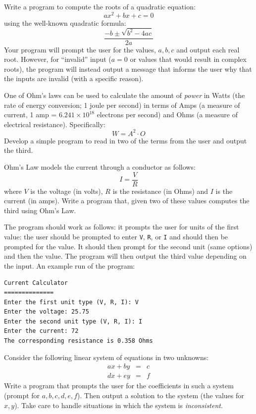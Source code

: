 \begin{exer}
Write a program to compute the roots of a quadratic equation:
  $$ax^2 + bx + c = 0$$
using the well-known quadratic formula:
  $$\frac{-b \pm \sqrt{b^2 - 4ac}}{2a}$$
Your program will prompt the user for the values, $a, b, c$ and output each real root.
However, for ``invalid'' input ($a = 0$ or values that would result in complex roots), the
program will instead output a message that informs the user why that the inputs are invalid
(with a specific reason).
\end{exer}

\begin{exer}
One of Ohm's laws can be used to calculate the amount of \emph{power} 
in Watts (the rate of energy conversion; 1 joule per second) in terms of Amps (a measure of current, 1 amp = $6.241 \times 10^{18}$ 
electrons per second) and Ohms (a measure of electrical resistance).  Specifically:
  $$W = A^2 \cdot O$$
Develop a simple program to read in two of the terms from the user and output the third.
\end{exer}

\begin{exer}
Ohm's Law models the current through a conductor as follows:
 $$I = \frac{V}{R}$$
where $V$ is the voltage (in volts), $R$ is the resistance (in Ohms) and $I$ is the
current (in amps).  Write a program that, given two of these values computes the
third using Ohm's Law.

The program should work as follows: it prompts the user for units of the first value: the user
should be prompted to enter \texttt{V}, \texttt{R}, or \texttt{I} and should then be
prompted for the value.  It should then prompt for the second unit (same options) and then
the value.  The program will then output the third value depending on the input.  An example
run of the program:

\begin{verbatim}
Current Calculator
==============
Enter the first unit type (V, R, I): V
Enter the voltage: 25.75
Enter the second unit type (V, R, I): I
Enter the current: 72
The corresponding resistance is 0.358 Ohms
\end{verbatim}
\end{exer}

\begin{exer}
Consider the following linear system of equations in two unknowns:
$$\begin{array}{rcl}
  ax + by & = & c \\
  dx + ey & = & f 
\end{array}$$
Write a program that prompts the user for the coefficients in such a system (prompt for $a, b, c, d, e, f$).  Then 
output a solution to the system (the values for $x, y$).  Take care to handle situations in which
the system is \emph{inconsistent}.
\end{exer}

